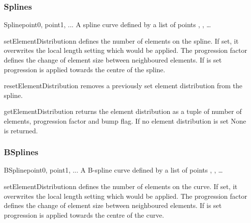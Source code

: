 \subsubsection{Splines}
\begin{classdesc}{Spline}{point0, point1, ...}
A spline curve defined by a list of points , , \ldots
\end{classdesc}

\begin{methoddesc}[Spline]{setElementDistribution}{n}
defines the number of elements on the spline. If set, it overwrites the local
length setting which would be applied.
The progression factor  defines the change of element size
between neighboured elements. If  is set progression is
applied towards the centre of the spline.
\end{methoddesc}

\begin{methoddesc}[Spline]{resetElementDistribution}{}
removes a previously set element distribution from the spline.
\end{methoddesc}

\begin{methoddesc}[Spline]{getElementDistribution}{}
returns the element distribution as a tuple of number of elements, progression
factor and bump flag. If no element distribution is set None is returned.
\end{methoddesc}

\subsubsection{BSplines}
\begin{classdesc}{BSpline}{point0, point1, ...}
A B-spline curve defined by a list of points , , \ldots
\end{classdesc}

\begin{methoddesc}[BSpline]{setElementDistribution}{n}
defines the number of elements on the curve. If set, it overwrites the local
length setting which would be applied.
The progression factor  defines the change of element size
between neighboured elements. If  is set progression is
applied towards the centre of the curve.
\end{methoddesc}

